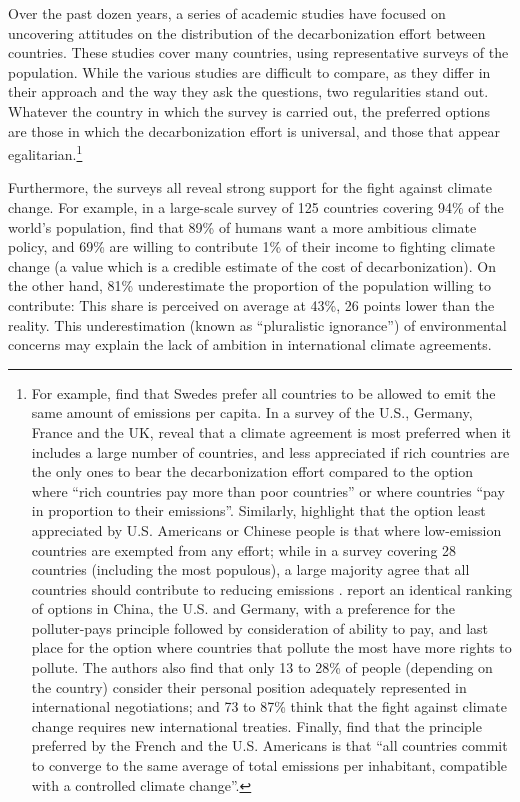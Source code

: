 \documentclass[a5paper,english,openany]{memoir}
\begin{document}
Over the past dozen years, a series of academic studies have focused on uncovering attitudes on the distribution of the decarbonization effort between countries. These studies cover many countries, using representative surveys of the population. While the various studies are difficult to compare, as they differ in their approach and the way they ask the questions, two regularities stand out. Whatever the country in which the survey is carried out, the preferred options are those in which the decarbonization effort is universal, and those that appear egalitarian.\footnote{For example, \citet{carlsson_is_2011} find that Swedes prefer all countries to be allowed to emit the same amount of emissions per capita. In a survey of the U.S., Germany, France and the UK, \citet{bechtel_mass_2013} reveal that a climate agreement is most preferred when it includes a large number of countries, %
and less appreciated if rich countries are the only ones to bear the decarbonization effort compared to the option where ``rich countries pay more than poor countries'' or where countries ``pay in proportion to their emissions''. Similarly, \citet{carlsson_fair_2013} highlight that the option least appreciated by U.S. Americans or Chinese people is that where low-emission countries are exempted from any effort; while in a survey covering 28 countries (including the most populous), a large majority agree that all countries should contribute to reducing emissions \citep{dabla-norris_public_2023}. 
\citet{schleich_citizens_2016} report an identical ranking of options in China, the U.S. and Germany, with a preference for the polluter-pays principle followed by consideration of ability to pay, and last place for the option where countries that pollute the most have more rights to pollute. The authors also find that only 13 to 28\% of people (depending on the country) consider their personal position adequately represented in international negotiations; and 73 to 87\% think that the fight against climate change requires new international treaties. Finally, \citet{meilland_international_2023} find that the principle preferred by the French and the U.S. Americans is that ``all countries commit to converge to the same average of total emissions per inhabitant, compatible with a controlled climate change''.} %

Furthermore, the surveys all reveal strong support for the fight against climate change. For example, in a large-scale survey of 125 countries covering 94\% of the world's population, \citet{andre_globally_2024} find that 89\% of humans want a more ambitious climate policy, and 69\% are willing to contribute 1\% of their income to fighting climate change (a value which is a credible estimate of the cost of decarbonization). 
On the other hand, 81\% underestimate the proportion of the population willing to contribute: %
This share is perceived on average at 43\%, 26 points lower than the reality. This underestimation (known as ``pluralistic ignorance'') of environmental concerns may explain the lack of ambition in international climate agreements. %
\end{document}
